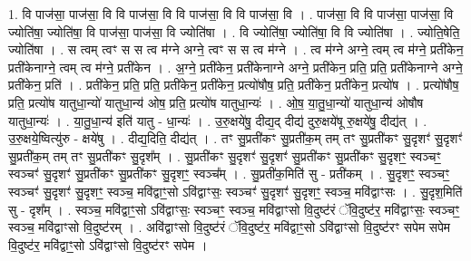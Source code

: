\documentclass[17pt]{extarticle}
\begin{document}
1. वि पाज॑सा॒ पाज॑सा॒ वि वि पाज॑सा॒ वि वि पाज॑सा॒ वि वि पाज॑सा॒ वि । . पाज॑सा॒ वि वि पाज॑सा॒ पाज॑सा॒ वि ज्योति॑षा॒ ज्योति॑षा॒ वि पाज॑सा॒ पाज॑सा॒ वि ज्योति॑षा । . वि ज्योति॑षा॒ ज्योति॑षा॒ वि वि ज्योति॑षा । . ज्योति॒षेति॒ ज्योति॑षा । . स त्वम् त्वꣳ स स त्व म॑ग्ने अग्ने॒ त्वꣳ स स त्व म॑ग्ने । . त्व म॑ग्ने अग्ने॒ त्वम् त्व म॑ग्ने॒ प्रती॑केन॒ प्रती॑केनाग्ने॒ त्वम् त्व म॑ग्ने॒ प्रती॑केन । . अ॒ग्ने॒ प्रती॑केन॒ प्रती॑केनाग्ने अग्ने॒ प्रती॑केन॒ प्रति॒ प्रति॒ प्रती॑केनाग्ने अग्ने॒ प्रती॑केन॒ प्रति॑ । . प्रती॑केन॒ प्रति॒ प्रति॒ प्रती॑केन॒ प्रती॑केन॒ प्रत्यो॑षौष॒ प्रति॒ प्रती॑केन॒ प्रती॑केन॒ प्रत्यो॑ष । . प्रत्यो॑षौष॒ प्रति॒ प्रत्यो॑ष यातुधा॒न्यो॑ यातुधा॒न्य॑ ओष॒ प्रति॒ प्रत्यो॑ष यातुधा॒न्यः॑ । . ओ॒ष॒ या॒तु॒धा॒न्यो॑ यातुधा॒न्य॑ ओषौष यातुधा॒न्यः॑ । . या॒तु॒धा॒न्य॑ इति॑ यातु - धा॒न्यः॑ । . उ॒रु॒क्षये॑षु॒ दीद्य॒द् दीद्य॑ दुरु॒क्षये॑षू रु॒क्षये॑षु॒ दीद्य॑त् । . उ॒रु॒क्षये॒ष्वित्यु॑रु - क्षये॑षु । . दीद्य॒दिति॒ दीद्य॑त् । . तꣳ सु॒प्रती॑कꣳ सु॒प्रती॑क॒म् तम् तꣳ सु॒प्रती॑कꣳ सु॒दृशꣳ॑ सु॒दृशꣳ॑ सु॒प्रती॑क॒म् तम् तꣳ सु॒प्रती॑कꣳ सु॒दृश᳚म् । . सु॒प्रती॑कꣳ सु॒दृशꣳ॑ सु॒दृशꣳ॑ सु॒प्रती॑कꣳ सु॒प्रती॑कꣳ सु॒दृशꣳ॒॒ स्वञ्चꣳ॒॒ स्वञ्चꣳ॑ सु॒दृशꣳ॑ सु॒प्रती॑कꣳ सु॒प्रती॑कꣳ सु॒दृशꣳ॒॒ स्वञ्च᳚म् । . सु॒प्रती॑क॒मिति॑ सु - प्रती॑कम् । . सु॒दृशꣳ॒॒ स्वञ्चꣳ॒॒ स्वञ्चꣳ॑ सु॒दृशꣳ॑ सु॒दृशꣳ॒॒ स्वञ्च॒ मवि॑द्वाꣳ॒॒सो ऽवि॑द्वाꣳसः॒ स्वञ्चꣳ॑ सु॒दृशꣳ॑ सु॒दृशꣳ॒॒ स्वञ्च॒ मवि॑द्वाꣳसः । . सु॒दृश॒मिति॑ सु - दृश᳚म् । . स्वञ्च॒ मवि॑द्वाꣳ॒॒सो ऽवि॑द्वाꣳसः॒ स्वञ्चꣳ॒॒ स्वञ्च॒ मवि॑द्वाꣳसो वि॒दुष्ट॑रं ॅवि॒दुष्ट॑र॒ मवि॑द्वाꣳसः॒ स्वञ्चꣳ॒॒ स्वञ्च॒ मवि॑द्वाꣳसो वि॒दुष्ट॑रम् । . अवि॑द्वाꣳसो वि॒दुष्ट॑रं ॅवि॒दुष्ट॑र॒ मवि॑द्वाꣳ॒॒सो ऽवि॑द्वाꣳसो वि॒दुष्ट॑रꣳ सपेम सपेम वि॒दुष्ट॑र॒ मवि॑द्वाꣳ॒॒सो ऽवि॑द्वाꣳसो वि॒दुष्ट॑रꣳ सपेम । \newline
\end{document}
